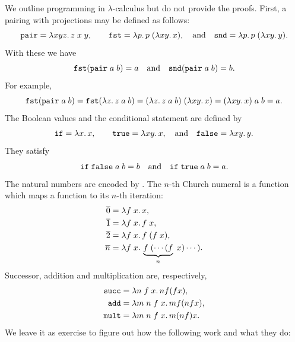 We outline programming in $\lambda$-calculus but do not provide the
proofs. First, a pairing with projections may be defined as follows:
%
\begin{equation*}
  \mathtt{pair} = \lambda x y z .\,z\; x\; y,
  \qquad
  \mathtt{fst} = \lambda p .\,p \; (\lambda x y .\,x),
  \quad\text{and}\quad
  \mathtt{snd} = \lambda p .\,p \; (\lambda x y .\,y).
\end{equation*}
%
With these we have
%
\begin{equation*}
  \mathtt{fst} (\mathtt{pair}\; a\; b) = a
  \quad\text{and}\quad
  \mathtt{snd} (\mathtt{pair}\; a\; b) = b.
\end{equation*}
%
For example,
%
\begin{equation*}
  \mathtt{fst} (\mathtt{pair}\; a\; b) =
  \mathtt{fst} (\lambda z .\,z\; a\; b) =
  (\lambda z .\,z\; a\; b) \; (\lambda x y .\,x) =
  (\lambda x y .\,x) \; a \; b = a.
\end{equation*}
%
The Boolean values and the conditional statement are defined by
%
\begin{equation*}
  \mathtt{if} = \lambda x .\,x,
  \qquad
  \mathtt{true} = \lambda x y .\,x,
  \quad\text{and}\quad
  \mathtt{false} = \lambda x y .\,y.
\end{equation*}
%
They satisfy
%
\begin{equation*}
  \mathtt{if}\;\mathtt{false}\;a\;b = b
  \quad\text{and}\quad
  \mathtt{if}\;\mathtt{true}\;a\;b = a.
\end{equation*}
%
The natural numbers are encoded by . The $n$-th
Church numeral is a function which maps a function to its $n$-th
iteration:
%
\begin{align*}
  \overline{0} &= \lambda f\;x .\,x,\\
  \overline{1} &= \lambda f\;x .\,f\;x,\\
  \overline{2} &= \lambda f\;x .\,f\;(f\;x),\\
  \overline{n} &= \lambda f\;x .\,\underbrace{f\;(\cdots (f}_n\;x) \cdots).
\end{align*}
%
Successor, addition and multiplication are, respectively,
%
\begin{align*}
  \mathtt{succ} &= \lambda n\;f\;x .\,n f (f x),\\
  \mathtt{add} &= \lambda m\;n\;f\;x .\,m f (n f x),\\
  \mathtt{mult} &= \lambda m\;n\;f\;x .\,m (n f) x.
\end{align*}
%
We leave it as exercise to figure out how the following work and what
they do:

